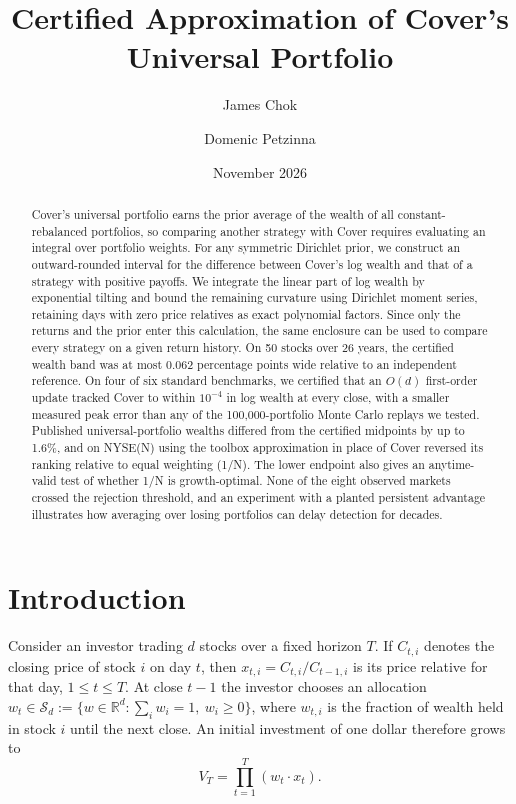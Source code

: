 \documentclass{article}
\title{Certified Approximation of Cover's Universal Portfolio}
\author[1, 2]{James Chok}
\author[ ]{Domenic Petzinna}
\affil[1]{School of Mathematics and Maxwell Institute for
  Mathematical Sciences, University of Edinburgh, United Kingdom}
\affil[2]{School of Mathematics and Statistics, UNSW Sydney,
  Australia}
\date{November 2026}
\numberwithin{equation}{section}
\theoremstyle{remark}
\begin{document}
\maketitle
\raggedbottom
\linenumbers

\begin{abstract}
Cover's universal portfolio earns the prior average of the wealth of all
constant-rebalanced portfolios, so comparing another strategy with Cover
requires evaluating an integral over portfolio weights. For any symmetric
Dirichlet prior, we construct an outward-rounded interval for the difference
between Cover's log wealth and that of a strategy with positive payoffs.
We integrate the linear part of log wealth by exponential tilting and bound
the remaining curvature using Dirichlet moment series, retaining days with
zero price relatives as exact polynomial factors. Since only the returns and
the prior enter this calculation, the same enclosure can be used to compare
every strategy on a given return history. On 50 stocks over 26 years, the
certified wealth band was at most 0.062 percentage points wide relative to an
independent reference. On four of six standard benchmarks, we certified that
an $O(d)$ first-order update tracked Cover to within $10^{-4}$ in log wealth
at every close, with a smaller measured peak error than any of the
100,000-portfolio Monte Carlo replays we tested. Published universal-portfolio
wealths differed from the certified midpoints by up to 1.6\%, and on NYSE(N)
using the toolbox approximation in place of Cover reversed its ranking
relative to equal weighting (1/N). The lower endpoint also gives an anytime-valid
test of whether 1/N is growth-optimal. None of the eight observed markets
crossed the rejection threshold, and an experiment with a planted persistent
advantage illustrates how averaging over losing portfolios can delay detection
for decades.
\end{abstract}

\section{Introduction}
Consider an investor trading $d$ stocks over a fixed horizon $T$. If
$C_{t,i}$ denotes the closing price of stock $i$ on day $t$, then
$x_{t,i}=C_{t,i}/C_{t-1,i}$ is its price relative for that day,
$1\le t\le T$. At close $t-1$ the investor chooses an allocation
$w_t\in\mathcal S_d:=\{w\in\mathbb{R}^d:\sum_i w_i=1,\ w_i\ge0\}$,
where $w_{t,i}$ is the fraction of wealth held in stock $i$ until the next
close. An initial investment of one dollar therefore grows to
\begin{equation}
  V_T=\prod_{t=1}^T(w_t\cdot x_t).
\end{equation}
\end{document}
